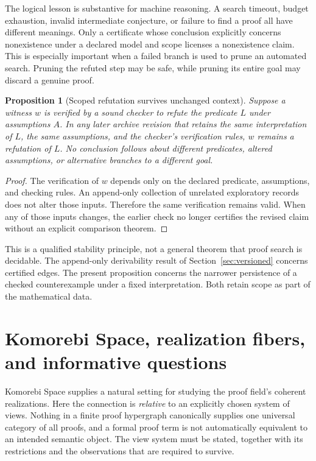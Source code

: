 \documentclass[11pt,oneside]{article}
\newtheorem{proposition}[theorem]{Proposition}
\theoremstyle{definition}
\theoremstyle{remark}
\begin{document}
The logical lesson is substantive for machine reasoning. A search timeout, budget exhaustion, invalid intermediate conjecture, or failure to find a proof all have different meanings. Only a certificate whose conclusion explicitly concerns nonexistence under a declared model and scope licenses a nonexistence claim. This is especially important when a failed branch is used to prune an automated search. Pruning the refuted step may be safe, while pruning its entire goal may discard a genuine proof.

\begin{proposition}[Scoped refutation survives unchanged context]
Suppose a witness $w$ is verified by a sound checker to refute the predicate $L$ under assumptions $A$. In any later archive revision that retains the same interpretation of $L$, the same assumptions, and the checker's verification rules, $w$ remains a refutation of $L$. No conclusion follows about different predicates, altered assumptions, or alternative branches to a different goal.
\end{proposition}
\begin{proof}
The verification of $w$ depends only on the declared predicate, assumptions, and checking rules. An append-only collection of unrelated exploratory records does not alter those inputs. Therefore the same verification remains valid. When any of those inputs changes, the earlier check no longer certifies the revised claim without an explicit comparison theorem.
\end{proof}

This is a qualified stability principle, not a general theorem that proof search is decidable. The append-only derivability result of Section~\ref{sec:versioned} concerns certified edges. The present proposition concerns the narrower persistence of a checked counterexample under a fixed interpretation. Both retain scope as part of the mathematical data.

\section{Komorebi Space, realization fibers, and informative questions}
\label{sec:komorebi-bridge}

Komorebi Space supplies a natural setting for studying the proof field's coherent realizations. Here the connection is \emph{relative} to an explicitly chosen system of views. Nothing in a finite proof hypergraph canonically supplies one universal category of all proofs, and a formal proof term is not automatically equivalent to an intended semantic object. The view system must be stated, together with its restrictions and the observations that are required to survive.
\end{document}
